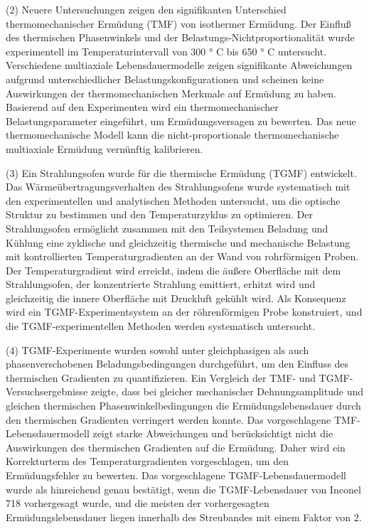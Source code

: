 (2) Neuere Untersuchungen zeigen den signifikanten Unterschied thermomechanischer Ermüdung (TMF) von isothermer Ermüdung. Der Einfluß des thermischen Phasenwinkels und der Belastungs-Nichtproportionalität wurde experimentell im Temperaturintervall von 300 ° C bis 650 ° C untersucht. Verschiedene multiaxiale Lebensdauermodelle zeigen signifikante Abweichungen aufgrund unterschiedlicher Belastungskonfigurationen und scheinen keine Auswirkungen der thermomechanischen Merkmale auf Ermüdung zu haben. Basierend auf den Experimenten wird ein thermomechanischer Belastungsparameter eingeführt, um Ermüdungsversagen zu bewerten. Das neue thermomechanische Modell kann die nicht-proportionale thermomechanische multiaxiale Ermüdung vernünftig kalibrieren.

(3) Ein Strahlungsofen wurde für die thermische Ermüdung (TGMF) entwickelt. Das Wärmeübertragungsverhalten des Strahlungsofens wurde systematisch mit den experimentellen und analytischen Methoden untersucht, um die optische Struktur zu bestimmen und den Temperaturzyklus zu optimieren. Der Strahlungsofen ermöglicht zusammen mit den Teilsystemen Beladung und Kühlung eine zyklische und gleichzeitig thermische und mechanische Belastung mit kontrollierten Temperaturgradienten an der Wand von rohrförmigen Proben. Der Temperaturgradient wird erreicht, indem die äußere Oberfläche mit dem Strahlungsofen, der konzentrierte Strahlung emittiert, erhitzt wird und gleichzeitig die innere Oberfläche mit Druckluft gekühlt wird. Als Konsequenz wird ein TGMF-Experimentsystem an der röhrenförmigen Probe konstruiert, und die TGMF-experimentellen Methoden werden systematisch untersucht.

(4) TGMF-Experimente wurden sowohl unter gleichphasigen als auch phasenverschobenen Beladungsbedingungen durchgeführt, um den Einfluss des thermischen Gradienten zu quantifizieren. Ein Vergleich der TMF- und TGMF-Versuchsergebnisse zeigte, dass bei gleicher mechanischer Dehnungsamplitude und gleichen thermischen Phasenwinkelbedingungen die Ermüdungslebensdauer durch den thermischen Gradienten verringert werden konnte. Das vorgeschlagene TMF-Lebensdauermodell zeigt starke Abweichungen und berücksichtigt nicht die Auswirkungen des thermischen Gradienten auf die Ermüdung. Daher wird ein Korrekturterm des Temperaturgradienten vorgeschlagen, um den Ermüdungsfehler zu bewerten. Das vorgeschlagene TGMF-Lebensdauermodell wurde als hinreichend genau bestätigt, wenn die TGMF-Lebensdauer von Inconel 718 vorhergesagt wurde, und die meisten der vorhergesagten Ermüdungslebensdauer liegen innerhalb des Streubandes mit einem Faktor von 2.